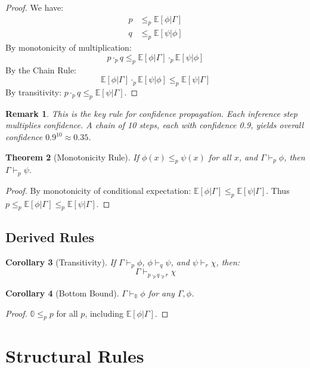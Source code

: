 \documentclass[11pt,a4paper]{article}
\newtheorem{theorem}{Theorem}[section]
\newtheorem{corollary}[theorem]{Corollary}
\newtheorem{remark}[theorem]{Remark}
\newcommand{\E}{\mathbb{E}}
\newcommand{\pzero}{\mathbb{0}}
\newcommand{\ple}{\leq_p}
\newcommand{\pmul}{\cdot_p}
\newcommand{\entails}[1]{\vdash_{#1}}
\begin{document}
\begin{proof}
We have:
\begin{align*}
    p &\ple \E[\phi|\Gamma] \\
    q &\ple \E[\psi|\phi]
\end{align*}
By monotonicity of multiplication:
\[
p \pmul q \ple \E[\phi|\Gamma] \pmul \E[\psi|\phi]
\]
By the Chain Rule:
\[
\E[\phi|\Gamma] \pmul \E[\psi|\phi] \ple \E[\psi|\Gamma]
\]
By transitivity: $p \pmul q \ple \E[\psi|\Gamma]$.
\end{proof}

\begin{remark}
This is the key rule for confidence propagation. Each inference step \emph{multiplies} confidence. A chain of 10 steps, each with confidence 0.9, yields overall confidence $0.9^{10} \approx 0.35$.
\end{remark}

\begin{theorem}[Monotonicity Rule]
If $\phi(x) \ple \psi(x)$ for all $x$, and $\Gamma \entails{p} \phi$, then $\Gamma \entails{p} \psi$.
\end{theorem}

\begin{proof}
By monotonicity of conditional expectation: $\E[\phi|\Gamma] \ple \E[\psi|\Gamma]$.
Thus $p \ple \E[\phi|\Gamma] \ple \E[\psi|\Gamma]$.
\end{proof}

\subsection{Derived Rules}

\begin{corollary}[Transitivity]
If $\Gamma \entails{p} \phi$, $\phi \entails{q} \psi$, and $\psi \entails{r} \chi$, then:
\[
\Gamma \entails{p \pmul q \pmul r} \chi
\]
\end{corollary}

\begin{corollary}[Bottom Bound]
$\Gamma \entails{\pzero} \phi$ for any $\Gamma, \phi$.
\end{corollary}

\begin{proof}
$\pzero \ple p$ for all $p$, including $\E[\phi|\Gamma]$.
\end{proof}

\section{Structural Rules}
\end{document}
